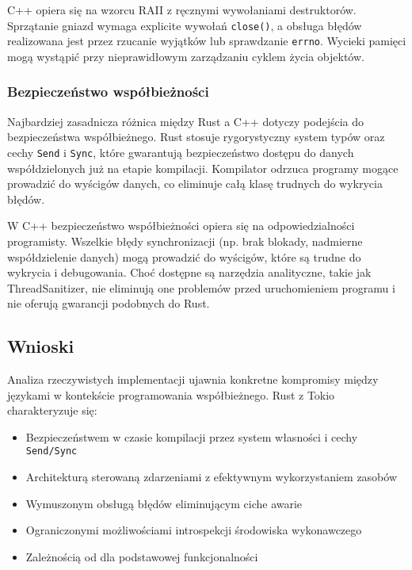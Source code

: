 C++ opiera się na wzorcu RAII z ręcznymi wywołaniami destruktorów. Sprzątanie gniazd wymaga explicite wywołań \texttt{close()}, a obsługa błędów realizowana jest przez rzucanie wyjątków lub sprawdzanie \texttt{errno}. Wycieki pamięci mogą wystąpić przy nieprawidłowym zarządzaniu cyklem życia objektów.


\subsubsection{Bezpieczeństwo współbieżności}

Najbardziej zasadnicza różnica między Rust a C++ dotyczy podejścia do bezpieczeństwa współbieżnego. Rust stosuje rygorystyczny system typów oraz cechy \texttt{Send} i \texttt{Sync}, które gwarantują bezpieczeństwo dostępu do danych współdzielonych już na etapie kompilacji. Kompilator odrzuca programy mogące prowadzić do wyścigów danych, co eliminuje całą klasę trudnych do wykrycia błędów.

W C++ bezpieczeństwo współbieżności opiera się na odpowiedzialności programisty. Wszelkie błędy synchronizacji (np. brak blokady, nadmierne współdzielenie danych) mogą prowadzić do wyścigów, które są trudne do wykrycia i debugowania. Choć dostępne są narzędzia analityczne, takie jak ThreadSanitizer, nie eliminują one problemów przed uruchomieniem programu i nie oferują gwarancji podobnych do Rust.



\subsection{Wnioski}

Analiza rzeczywistych implementacji ujawnia konkretne kompromisy między językami w kontekście programowania współbieżnego.
Rust z Tokio charakteryzuje się:
\begin{itemize}
    \item Bezpieczeństwem w czasie kompilacji przez system własności i cechy \texttt{Send/Sync}
    \item Architekturą sterowaną zdarzeniami z efektywnym wykorzystaniem zasobów
    \item Wymuszonym obsługą błędów eliminującym ciche awarie 
    \item Ograniczonymi możliwościami introspekcji środowiska wykonawczego
    \item Zależnością od  dla podstawowej funkcjonalności
\end{itemize}

